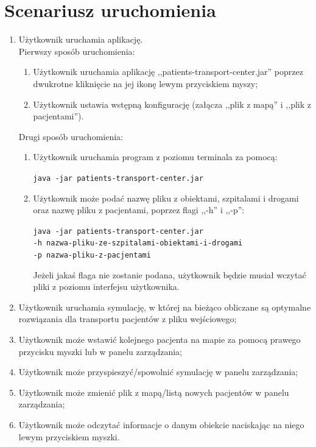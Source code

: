 \documentclass{article}
\begin{document}
\section{Scenariusz uruchomienia}
{\fontsize{12}{12}\selectfont
\begin{enumerate}
    \item Użytkownik uruchamia aplikację. \\
    Pierwszy sposób uruchomienia:
    \begin{enumerate}
        \item Użytkownik uruchamia aplikację ,,patients-transport-center.jar” poprzez dwukrotne kliknięcie na jej ikonę lewym przyciskiem myszy;
        \item Użytkownik ustawia wstępną konfigurację (załącza ,,plik z mapą'' i ,,plik z pacjentami'').
    \end{enumerate}
    Drugi sposób uruchomienia:
    \begin{enumerate}
        \item Użytkownik uruchamia program z poziomu terminala za pomocą: 
            \begin{center}
                \texttt{java -jar patients-transport-center.jar} 
            \end{center}
            
        \item Użytkownik może podać nazwę pliku z obiektami, szpitalami i drogami oraz nazwę pliku z pacjentami, poprzez flagi ,,-h'' i ,,-p'':
        
        \begin{center}
                \texttt{java -jar patients-transport-center.jar \\}
                \texttt{-h nazwa-pliku-ze-szpitalami-obiektami-i-drogami \\ 
                -p nazwa-pliku-z-pacjentami}
        \end{center}
        
        Jeżeli jakaś flaga nie zostanie podana, użytkownik będzie musiał wczytać pliki z poziomu interfejsu użytkownika.
    \end{enumerate}
    
    \item Użytkownik uruchamia symulację, w której na bieżąco obliczane są optymalne rozwiązania dla transportu pacjentów z pliku wejściowego;
    \item Użytkownik może wstawić kolejnego pacjenta na mapie za pomocą prawego przycisku myszki lub w panelu zarządzania;
    \item Użytkownik może przyspieszyć/spowolnić symulację w panelu zarządzania;
    \item Użytkownik może zmienić plik z mapą/listą nowych pacjentów w panelu zarządzania;
    \item Użytkownik może odczytać informacje o danym obiekcie naciskając na niego lewym przyciskiem myszki.
\end{enumerate}

}
\end{document}
